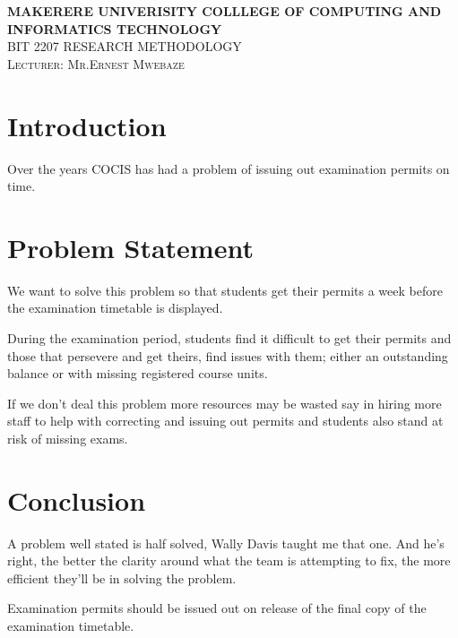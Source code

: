 \documentclass{article}
\begin{document}
\begin{titlepage}
\begin{center}
\huge{\bfseries MAKERERE UNIVERISITY COLLLEGE OF COMPUTING AND INFORMATICS TECHNOLOGY}\\
[1in]
\textsc{\LARGE BIT 2207 RESEARCH METHODOLOGY\\
Lecturer: Mr.Ernest Mwebaze}\\
[1cm]
\end{center}
\end{titlepage}
\newpage
\section{Introduction}
Over the years COCIS has had a problem of issuing out examination permits on time.
\section{Problem Statement}
We want to solve this problem so that students get their permits a week before the examination timetable is displayed.

During the examination period, students find it difficult to get their permits and those that persevere and get theirs, find issues with them; either an outstanding balance or with missing registered course units.

If we don't deal this problem more resources may be wasted say in hiring more staff to help with correcting and issuing out permits and students also stand at risk of missing exams.
\section{Conclusion}
A problem well stated is half solved, Wally Davis taught me that one.  And he's right, the better the clarity around what the team is attempting to fix, the more efficient they'll be in solving the problem.

Examination permits should be issued out on release of the final copy of the examination timetable.
\end{document}
